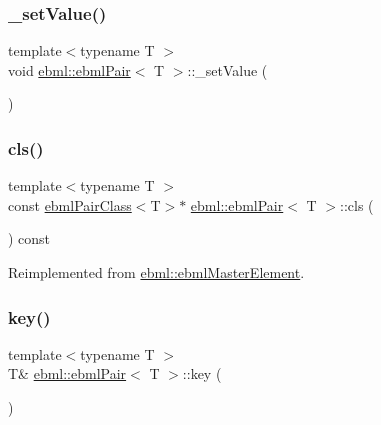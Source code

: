 \subsubsection{\texorpdfstring{\+\_\+set\+Value()}{\_setValue()}\hspace{0.1cm}{\footnotesize\ttfamily [2/2]}}
{\footnotesize\ttfamily template$<$typename T $>$ \\
void \mbox{\hyperlink{classebml_1_1ebmlPair}{ebml\+::ebml\+Pair}}$<$ T $>$\+::\+\_\+set\+Value (\begin{DoxyParamCaption}\item[{\mbox{\hyperlink{namespaceebml_adad533b7705a16bb360fe56380c5e7be}{ebml\+Element\+\_\+sp}} \&\&}]{ }\end{DoxyParamCaption})\hspace{0.3cm}{\ttfamily [protected]}}

\mbox{\label{classebml_1_1ebmlPair_ad1244458e1390cbf567dfd460b0002f2}} 
\subsubsection{\texorpdfstring{cls()}{cls()}}
{\footnotesize\ttfamily template$<$typename T $>$ \\
const \mbox{\hyperlink{classebml_1_1ebmlPairClass}{ebml\+Pair\+Class}}$<$T$>$$\ast$ \mbox{\hyperlink{classebml_1_1ebmlPair}{ebml\+::ebml\+Pair}}$<$ T $>$\+::cls (\begin{DoxyParamCaption}{ }\end{DoxyParamCaption}) const\hspace{0.3cm}{\ttfamily [virtual]}}



Reimplemented from \mbox{\hyperlink{classebml_1_1ebmlMasterElement_a4073fb3f7ce3dda153384821714df29e}{ebml\+::ebml\+Master\+Element}}.

\mbox{\label{classebml_1_1ebmlPair_a0989f9878a29f4c67b801a8744447217}} 
\subsubsection{\texorpdfstring{key()}{key()}\hspace{0.1cm}{\footnotesize\ttfamily [1/2]}}
{\footnotesize\ttfamily template$<$typename T $>$ \\
T\& \mbox{\hyperlink{classebml_1_1ebmlPair}{ebml\+::ebml\+Pair}}$<$ T $>$\+::key (\begin{DoxyParamCaption}{ }\end{DoxyParamCaption})}

